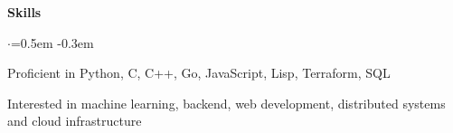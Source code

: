 \documentclass{resume} %
\DeclareRobustCommand{\&}{%
  \ifdim\fontdimen1\font>0pt
    \textsl{\symbol{`\&}}%
  \else
    \symbol{`\&}%
  \fi
}
\begin{document}

\begin{rSection}{\textbf{Skills}}
  \vspace {0.3em} 
  \begin{list}{$\cdot$}{\leftmargin=0.5em}
    \itemsep -0.3em \vspace{-0.3em}
    \item Proficient in  Python, C, C++, Go, JavaScript, Lisp, Terraform, SQL
    \item Interested in machine learning, backend, web development, distributed systems and cloud infrastructure
  \end{list}
  \vspace{0.3em}
\end{rSection}

\end{document}
